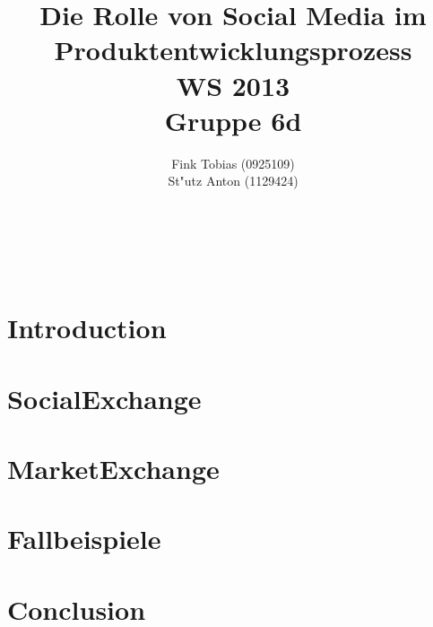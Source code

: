 \documentclass[a4paper, 12pt]{article} %
\title{\textbf{Die Rolle von Social Media im Produktentwicklungsprozess
}\\ %
WS 2013\\\vspace{5pt}
Gruppe 6d} %
\author{Fink Tobias (0925109)\\
 St"utz Anton (1129424)\\
 \vspace{10pt}
\textbf{}
\\{\textit{}}} %
\makeatletter
\renewcommand{\maketitle}{ %
\begin{flushright} %
{\LARGE\@title} %

\vspace{50pt} %

{\large\@author} %
\\ \vspace{10pt}\@date %

\vspace{40pt} %
\end{flushright}
}
\makeatother
\begin{document}
\maketitle %

\newpage

\tableofcontents

\newpage



\section{Introduction}


\section{SocialExchange}


\section{MarketExchange}


\section{Fallbeispiele}


\section{Conclusion}






\end{document}
